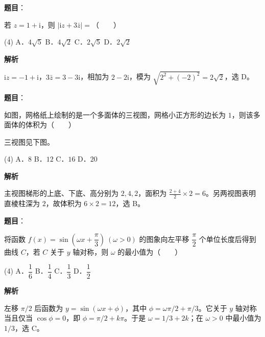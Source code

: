 \begin{answer}

\textbf{题目}：

若 $z=1+\mathrm i$，则 $\left|\mathrm iz+3\bar z\right|=$\mbox{（　　）}

\begin{gkopts}(4)
\task A．$4\sqrt5$
\task B．$4\sqrt2$
\task C．$2\sqrt5$
\task D．$2\sqrt2$
\end{gkopts}

\textbf{解析}

$\mathrm iz=-1+\mathrm i$，$3\bar z=3-3\mathrm i$，相加为 $2-2\mathrm i$，模为 $\sqrt{2^2+(-2)^2}=2\sqrt2$，选 D。


\end{answer}
\begin{answer}

\textbf{题目}：

如图，网格纸上绘制的是一个多面体的三视图，网格小正方形的边长为 $1$，则该多面体的体积为\mbox{（　　）}

三视图见下图。
\nopagebreak[4]
\begin{center}\end{center}
\nopagebreak[4]
\begin{gkopts}(4)
\task A．$8$
\task B．$12$
\task C．$16$
\task D．$20$
\end{gkopts}

\textbf{解析}

主视图梯形的上底、下底、高分别为 $2,4,2$，面积为 $\frac{2+4}{2}\times2=6$。另两视图表明直棱柱深为 $2$，故体积为 $6\times2=12$，选 B。


\end{answer}
\begin{answer}

\textbf{题目}：

将函数 $f(x)=\sin\left(\omega x+\dfrac{\pi}{3}\right)\ (\omega>0)$ 的图象向左平移 $\dfrac{\pi}{2}$ 个单位长度后得到曲线 $C$，若 $C$ 关于 $y$ 轴对称，则 $\omega$ 的最小值为\mbox{（　　）}

\begin{gkopts}(4)
\task A．$\dfrac16$
\task B．$\dfrac14$
\task C．$\dfrac13$
\task D．$\dfrac12$
\end{gkopts}

\textbf{解析}

左移 $\pi/2$ 后函数为 $y=\sin(\omega x+\phi)$，其中 $\phi=\omega\pi/2+\pi/3$。它关于 $y$ 轴对称当且仅当 $\cos\phi=0$，即 $\phi=\pi/2+k\pi$。于是 $\omega=1/3+2k$；在 $\omega>0$ 中最小值为 $1/3$，选 C。


\end{answer}
